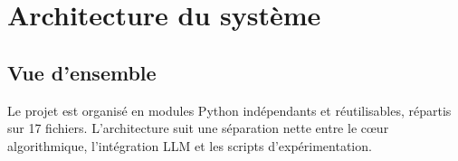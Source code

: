 \documentclass[12pt,a4paper]{article}
\begin{document}
\section{Architecture du syst\`{e}me}
\label{sec:architecture}

\subsection{Vue d'ensemble}

Le projet est organis\'{e} en modules Python ind\'{e}pendants et r\'{e}utilisables, r\'{e}partis sur 17 fichiers. L'architecture suit une s\'{e}paration nette entre le c\oe{}ur algorithmique, l'int\'{e}gration LLM et les scripts d'exp\'{e}rimentation.
\end{document}
